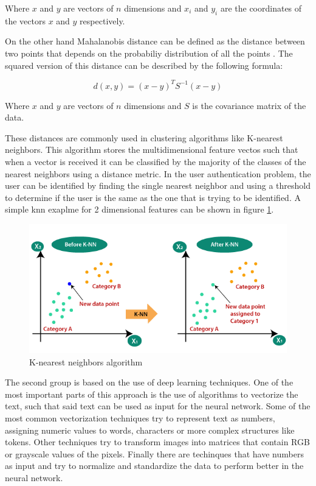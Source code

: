 Where $x$ and $y$ are vectors of $n$ dimensions and $x_i$ and $y_i$ are the coordinates of the vectors $x$ and $y$ respectively.

On the other hand Mahalanobis distance can be defined as the distance between two points that depends on the probabiliy distribution of all the points \cite{de2000mahalanobis}. The squared version of this distance can be described by the following formula:

\begin{equation}
	d(x,y) = (x-y)^T S^{-1} (x-y)
\end{equation}

Where $x$ and $y$ are vectors of $n$ dimensions and $S$ is the covariance matrix of the data.


These distances are commonly used in clustering algorithms like K-nearest neighbors. This algorithm stores the multidimensional feature vectos such that when a vector is received it can be classified by the majority of the classes of the nearest neighbors using a distance metric. In the user authentication problem, the user can be identified by finding the single nearest neighbor and using a threshold to determine if the user is the same as the one that is trying to be identified. A simple knn exaplme for 2 dimensional features can be shown in figure \ref{fig:knn}.

\begin{figure}[h]
    \centering
    \includegraphics[width=0.7\linewidth]{images/knn}
    \caption{K-nearest neighbors algorithm \cite{knn}}
    \label{fig:knn}
\end{figure}

The second group is based on the use of deep learning techniques. One of the most important parts of this approach is the use of algorithms to vectorize the text, such that said text can be used as input for the neural network. Some of the most common vectorization techniques try to represent text as numbers, assigning numeric values to words, characters or more complex structures like tokens. Other techniques try to transform images into matrices that contain RGB or grayscale values of the pixels. Finally there are techinques that have numbers as input and try to normalize and standardize the data to perform better in the neural network.

